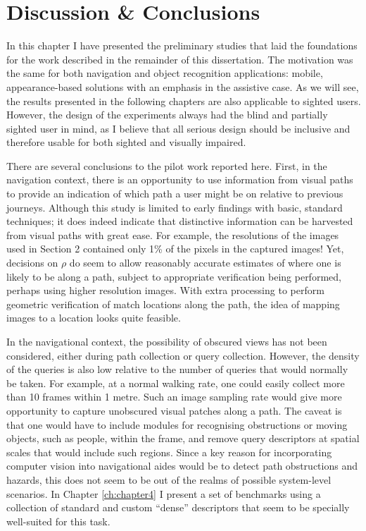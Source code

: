 

\section{Discussion \& Conclusions}

In this chapter I have presented the preliminary studies that laid the foundations for the work described in the remainder of this dissertation. The motivation was the same for both navigation and object recognition applications: mobile, appearance-based solutions with an emphasis in the assistive case. As we will see, the results presented in the following chapters are also applicable to sighted users. However, the design of the experiments always had the blind and partially sighted user in mind, as I believe that all serious design should be inclusive and therefore usable for both sighted and visually impaired. 

There are several conclusions to the pilot work reported here.  First, in the navigation context, there is an opportunity to use information from visual paths to provide an indication of which path a user might be on relative to previous journeys.  Although this study is limited to early findings with basic, standard techniques; it does indeed indicate that distinctive information can be harvested from visual paths with great ease.  For example, the resolutions of the images used in Section 2 contained only 1\% of the pixels in the captured images!  Yet, decisions on $\rho$ do seem to allow reasonably accurate estimates of where one is likely to be along a path, subject to appropriate verification being performed, perhaps using higher resolution images. With extra processing to perform geometric verification of match locations along the path, the idea of mapping images to a location looks quite feasible.

In the navigational context, the possibility of obscured views has not been considered, either during path collection or query collection. However, the density of the queries is also low relative to the number of queries that would normally be taken. For example, at a normal walking rate, one could easily collect more than 10 frames within 1 metre. Such an image sampling rate would give more opportunity to capture unobscured visual patches along a path. The caveat is that one would have to include modules for recognising obstructions or moving objects, such as people, within the frame, and remove query descriptors at  spatial scales that would include such regions. Since a key reason for incorporating computer vision into navigational aides would be to detect path obstructions and hazards, this does not seem to be out of the realms of possible system-level scenarios. In Chapter \ref{ch:chapter4} I present a set of benchmarks using a collection of standard and custom ``dense'' descriptors that seem to be specially well-suited for this task.

